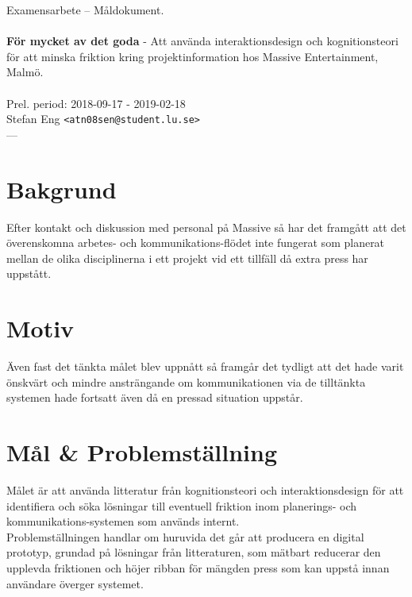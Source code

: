\documentclass{article}
\begin{document}
\begin{center}

  Examensarbete -- Måldokument. \\
  \ \\
  {\large
    \textbf{För mycket av det goda} -
    Att använda interaktionsdesign och kognitionsteori för
    att minska friktion kring projektinformation hos Massive
    Entertainment, Malmö. \\
  }
  \ \\
  Prel. period: 2018-09-17 - 2019-02-18\\
  Stefan Eng \texttt{<atn08sen@student.lu.se>}
  \ \\
  ---
  \vspace{-0.3cm}

\end{center}

\section*{Bakgrund}

  Efter kontakt och diskussion med personal på Massive så har det framgått att
  det överenskomna arbetes- och kommunikations-flödet inte fungerat som
  planerat mellan de olika disciplinerna i ett projekt vid ett tillfäll då
  extra press har uppstått.

\section*{Motiv}

  Även fast det tänkta målet blev uppnått så framgår det tydligt att det hade
  varit önskvärt och mindre ansträngande om kommunikationen via de
  tilltänkta systemen hade fortsatt även då en pressad situation uppstår.

\section*{Mål \& Problemställning}

  Målet är att använda litteratur från kognitionsteori och interaktionsdesign
  för att identifiera och söka lösningar till eventuell friktion inom
  planerings- och kommunikations-systemen som används internt. \\

  Problemställningen handlar om huruvida det går att producera en
  digital prototyp, grundad på lösningar från litteraturen, som mätbart
  reducerar den upplevda friktionen och höjer ribban för mängden press som kan
  uppstå innan användare överger systemet.
\end{document}
